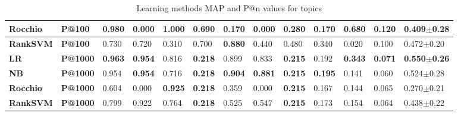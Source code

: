 \begin{table*}[tbh!]
{{\begin{tabular}{|l|l|l|l|l|l|l|l|l|l|l|l|l|}
\textbf{Rocchio} & \textbf{P@100} & \textbf{0.980} & 0.000 & \textbf{1.000} & 0.690 & 0.170 & 0.000 & 0.280 & 0.170 & 0.680 & 0.120 & 0.409$\pm$0.28 \\ \hline
\textbf{RankSVM} & \textbf{P@100} & 0.730 & 0.720 & 0.310 & 0.700 & \textbf{0.880} & 0.440 & 0.480 & 0.340 & 0.020 & 0.100 & 0.472$\pm$0.20 \\ \hline \hline
\textbf{LR} & \textbf{P@1000} & \textbf{0.963} & \textbf{0.954} & 0.816 & \textbf{0.218} & 0.899 & 0.833 & \textbf{0.215} & 0.192 & \textbf{0.343} & \textbf{0.071} & \textbf{0.550$\pm$0.26} \\ \hline
\textbf{NB} & \textbf{P@1000} & 0.954 & \textbf{0.954} & 0.716 & \textbf{0.218} & \textbf{0.904} & \textbf{0.881} & \textbf{0.215} & \textbf{0.195} & 0.141 & 0.060 & 0.524$\pm$0.28 \\ \hline
\textbf{Rocchio} & \textbf{P@1000} & 0.604 & 0.000 & \textbf{0.925} & \textbf{0.218} & 0.359 & 0.000 & \textbf{0.215} & 0.167 & 0.144 & 0.065 & 0.270$\pm$0.21 \\ \hline
\textbf{RankSVM} & \textbf{P@1000} & 0.799 & 0.922 & 0.764 & \textbf{0.218} & 0.525 & 0.547 & \textbf{0.215} & 0.173 & 0.154 & 0.064 & 0.438$\pm$0.22 \\ \hline
\end{tabular}
}}
\caption{Learning methods MAP and P@n values for topics}
\label{table:results2}
\end{table*}

